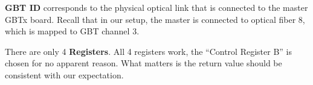 \begin{leftbar}
    \textbf{GBT ID} corresponds to the physical optical link that is connected
    to the master GBTx board.
    Recall that in our setup, the master is connected to optical fiber 8, which
    is mapped to GBT channel 3.
\end{leftbar}

\begin{leftbar}
    There are only 4 \textbf{Registers}.
    All 4 registers work, the ``Control Register B'' is chosen for no apparent
    reason.
    What matters is the return value should be consistent with our expectation.
\end{leftbar}
